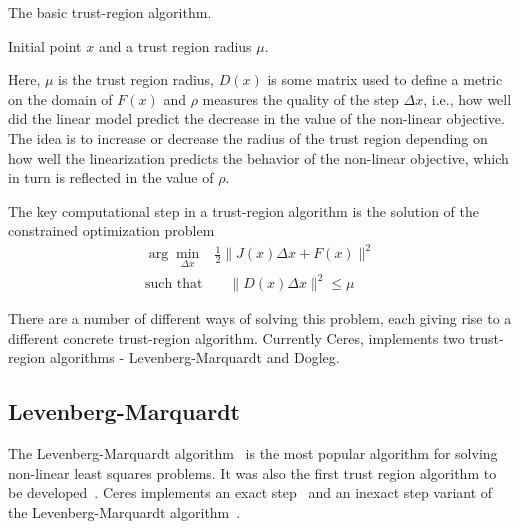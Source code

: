 \begin{algorithm}
\caption{The basic trust-region algorithm.\label{alg:trust-region}}
\begin{algorithmic}
\REQUIRE Initial point $x$ and a trust region radius $\mu$.
\LOOP
{}
\IF {$\rho > \epsilon$}
\ENDIF
{}
\ELSE
{}
\ENDIF
\ENDIF
\ENDLOOP
\end{algorithmic}
\end{algorithm}

Here, $\mu$ is the trust region radius, $D(x)$ is some matrix used to define a metric on the domain of $F(x)$ and $\rho$ measures the quality of the step $\Delta x$, i.e., how well did the linear model predict the decrease in the value of the non-linear objective. The idea is to increase or decrease the radius of the trust region depending on how well the linearization predicts the behavior of the non-linear objective, which in turn is reflected in the value of $\rho$.

The key computational step in a trust-region algorithm is the solution of the constrained optimization problem
\begin{align}
        \arg\min_{\Delta x}& \frac{1}{2}\|J(x)\Delta x + F(x)\|^2 \\
        \text{such that}&\quad  \|D(x)\Delta x\|^2 \le \mu
\label{eq:trp}
\end{align}

There are a number of different ways of solving this problem, each giving rise to a different concrete trust-region algorithm. Currently Ceres, implements two trust-region algorithms - Levenberg-Marquardt and  Dogleg.

\subsection{Levenberg-Marquardt}
The Levenberg-Marquardt algorithm~\cite{levenberg1944method, marquardt1963algorithm} is the most popular algorithm for solving non-linear least squares problems.  It was also the first trust region algorithm to be developed~\cite{levenberg1944method,marquardt1963algorithm}. Ceres implements an exact step~\cite{madsen2004methods} and an inexact step variant of the Levenberg-Marquardt algorithm~\cite{wright1985inexact,nash1990assessing}.

